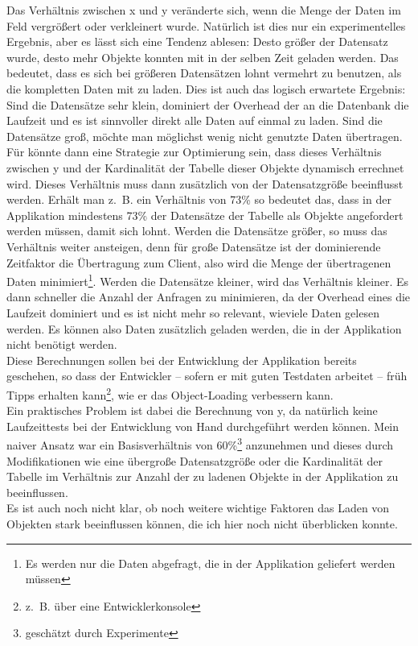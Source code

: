 Das Verhältnis zwischen x und y veränderte sich, wenn die Menge der Daten im Feld  vergrößert oder verkleinert wurde. Natürlich ist dies nur ein experimentelles Ergebnis, aber es lässt sich eine Tendenz ablesen: Desto größer der Datensatz wurde, desto mehr Objekte konnten mit  in der selben Zeit geladen werden. Das bedeutet, dass es sich bei größeren Datensätzen lohnt vermehrt  zu benutzen, als die kompletten Daten mit  zu laden. Dies ist auch das logisch erwartete Ergebnis: Sind die Datensätze sehr klein, dominiert der Overhead der  an die Datenbank die Laufzeit und es ist sinnvoller direkt alle Daten auf einmal zu laden. Sind die Datensätze groß, möchte man möglichst wenig nicht genutzte Daten übertragen. \\
Für \PSCORM könnte dann eine Strategie zur Optimierung sein, dass dieses Verhältnis zwischen y und der Kardinalität der Tabelle dieser Objekte dynamisch errechnet wird. Dieses Verhältnis muss dann zusätzlich von der Datensatzgröße beeinflusst werden. Erhält man z.~B. ein Verhältnis von 73\% so bedeutet das, dass in der Applikation mindestens 73\% der Datensätze der Tabelle als Objekte angefordert werden müssen, damit sich  lohnt. Werden die Datensätze größer, so muss das Verhältnis weiter ansteigen, denn für große Datensätze ist der dominierende Zeitfaktor die Übertragung zum Client, also wird die Menge der übertragenen Daten minimiert\footnote{Es werden nur die Daten abgefragt, die in der Applikation geliefert werden müssen}. Werden die Datensätze kleiner, wird das Verhältnis kleiner. Es dann schneller die Anzahl der Anfragen zu minimieren, da der Overhead eines  die Laufzeit dominiert und es ist nicht mehr so relevant, wieviele Daten gelesen werden. Es können also Daten zusätzlich geladen werden, die in der Applikation nicht benötigt werden. \\
Diese Berechnungen sollen bei der Entwicklung der Applikation bereits geschehen, so dass der Entwickler -- sofern er mit guten Testdaten arbeitet -- früh Tipps erhalten kann\footnote{z.~B. über eine Entwicklerkonsole}, wie er das Object-Loading verbessern kann. \\
Ein praktisches Problem ist dabei die Berechnung von y, da natürlich keine Laufzeittests bei der Entwicklung von Hand durchgeführt werden können. Mein naiver Ansatz war ein Basisverhältnis von 60\%\footnote{geschätzt durch Experimente} anzunehmen und dieses durch Modifikationen wie eine übergroße Datensatzgröße oder die Kardinalität der Tabelle im Verhältnis zur Anzahl der zu ladenen Objekte in der Applikation zu beeinflussen. \\
Es ist auch noch nicht klar, ob noch weitere wichtige Faktoren das Laden von Objekten stark beeinflussen können, die ich hier noch nicht überblicken konnte.\\
